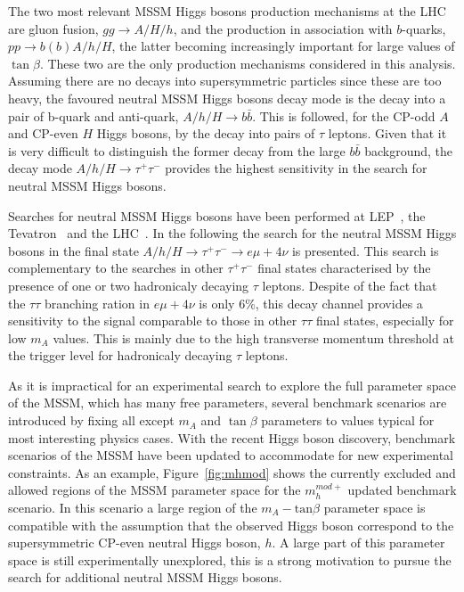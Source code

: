 The two most relevant MSSM Higgs bosons production mechanisms 
at the LHC are gluon fusion, $gg\rightarrow A/H/h$, and 
the production in association with $b$-quarks, $pp \rightarrow b(b)A/h/H$, the latter becoming increasingly 
important for large values of $\tan\beta$. These two are the only production mechanisms
considered in this analysis. 
Assuming there are no decays into supersymmetric particles since these are too heavy, 
the favoured neutral MSSM Higgs bosons decay mode  is the decay into a pair of b-quark and anti-quark,
$A/h/H \rightarrow b\bar{b}$. This is followed, for the CP-odd $A$ and CP-even $H$ Higgs bosons, 
by the decay into pairs of $\tau$ leptons. Given that it is very difficult to distinguish the former decay 
from the large $b\bar{b}$ background, the decay mode 
$A/h/H \rightarrow \tau^+ \tau^-$  provides the highest sensitivity in the search for neutral MSSM Higgs bosons.

Searches for neutral MSSM Higgs bosons have been performed at
LEP~\cite{LEPLimits}, the
Tevatron~\cite{TevatronLimits1} and the LHC~\cite{CMSLimit, ATLASLimit}. 
In the following the search for the neutral MSSM Higgs bosons  in the final state 
$A/h/H \rightarrow \tau^+ \tau^- \rightarrow e \mu +4\nu$ is presented. 
This search is complementary to the searches in other $\tau^+\tau^-$ final states
characterised by the presence of one or two hadronicaly decaying $\tau$ leptons. Despite of the fact that the 
$\tau\tau$ branching ration in $e \mu +4\nu$ is only 6\%, this decay channel provides a sensitivity 
to the signal comparable to those in other $\tau\tau$ final states, especially for low $m_A$ values. 
This is mainly due to the high transverse momentum threshold at the trigger level for  hadronicaly decaying $\tau$ leptons.

As it is impractical for an experimental  search to explore the full parameter space of the MSSM, 
which has many free parameters, several benchmark scenarios are  
introduced by fixing all except $m_A$ and $\tan\beta$ parameters to values typical for most interesting 
physics cases.
With the recent Higgs boson discovery, benchmark scenarios of the MSSM have been updated to 
accommodate for  new experimental constraints. 
As an example, Figure~\ref{fig:mhmod} shows the currently excluded and allowed regions of the MSSM parameter space
for the  $m_{h}^{mod+}$ updated benchmark scenario. In this scenario a large region of the $m_{A} - \text{tan}\beta$
parameter space is compatible with the assumption that the observed Higgs boson correspond to the supersymmetric
CP-even neutral Higgs boson, $h$. A large part of this parameter space is still experimentally unexplored,
this is a strong motivation to pursue the search for additional neutral MSSM Higgs bosons.


